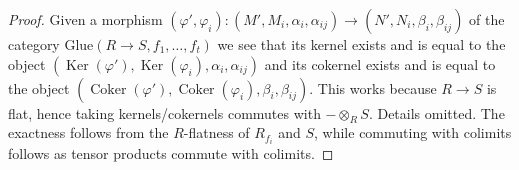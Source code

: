 \documentclass[10pt,a4paper]{amsart}
\theoremstyle{plain}
\theoremstyle{definition}
\theoremstyle{remark}
\numberwithin{equation}{subsection}
\def\Ker{\mathop{\mathrm{Ker}}}
\def\Coker{\mathop{\mathrm{Coker}}}
\begin{document}
\begin{proof}
Given a morphism
$(\varphi', \varphi_i) :
(M', M_i, \alpha_i, \alpha_{ij})
\to
(N', N_i, \beta_i, \beta_{ij})$
of the category $\text{Glue}(R \to S, f_1, \ldots, f_t)$
we see that its kernel exists and is equal to the object
$(\Ker(\varphi'), \Ker(\varphi_i), \alpha_i, \alpha_{ij})$
and its cokernel exists and is equal to the object
$(\Coker(\varphi'), \Coker(\varphi_i), \beta_i, \beta_{ij})$.
This works because $R \to S$ is flat, hence taking kernels/cokernels
commutes with $- \otimes_R S$. Details omitted.
The exactness follows from the $R$-flatness of $R_{f_i}$ and $S$, while
commuting with colimits follows as tensor products commute with colimits.
\end{proof}
\end{document}
